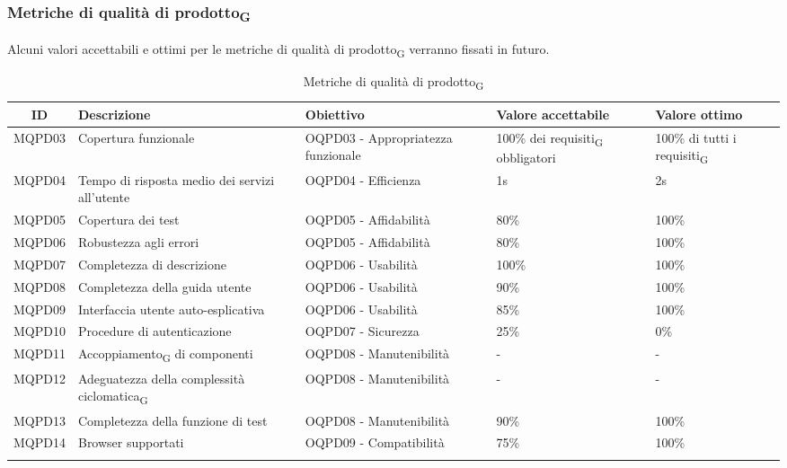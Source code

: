 \newpage
\subsubsection{Metriche di qualità di prodotto\textsubscript{G}}
Alcuni valori accettabili e ottimi per le metriche di qualità di prodotto\textsubscript{G} verranno fissati in futuro.
\begin{center}
	\setlength\extrarowheight{2pt}
	\begin{xltabular}{\textwidth}{|c|X|X|X|X|}
		\hline
		\textbf{ID} & \textbf{Descrizione} & \textbf{Obiettivo} & \textbf{Valore accettabile} & \textbf{Valore ottimo}\\
		\hline
		MQPD03 & Copertura funzionale & OQPD03 - Appropriatezza funzionale & 100\% dei requisiti\textsubscript{G} obbligatori & 100\% di tutti i requisiti\textsubscript{G}\\
		\hline
		MQPD04 & Tempo di risposta medio dei servizi all'utente & OQPD04 - Efficienza & 1s & 2s \\
		\hline
		MQPD05 & Copertura dei test & OQPD05 - Affidabilità & 80\% & 100\% \\
		\hline
		MQPD06 & Robustezza agli errori & OQPD05 - Affidabilità & 80\% & 100\% \\
		\hline
		MQPD07 & Completezza di descrizione & OQPD06 - Usabilità & 100\% &  100\% \\
		\hline
		MQPD08 & Completezza della guida utente & OQPD06 - Usabilità & 90\% &  100\% \\
		\hline
		MQPD09 & Interfaccia utente auto-esplicativa & OQPD06 - Usabilità & 85\% &  100\% \\
		\hline
		MQPD10 & Procedure di autenticazione & OQPD07 - Sicurezza & 25\% &  0\% \\
		\hline
		MQPD11 & Accoppiamento\textsubscript{G} di componenti & OQPD08 - Manutenibilità & - & - \\
		\hline
		MQPD12 & Adeguatezza della complessità ciclomatica\textsubscript{G} & OQPD08 - Manutenibilità & - & - \\
		\hline
		MQPD13 & Completezza della funzione di test & OQPD08 - Manutenibilità & 90\% & 100\% \\
		\hline
		MQPD14 & Browser supportati & OQPD09 - Compatibilità & 75\% & 100\% \\
		\hline
		\caption{Metriche di qualità di prodotto\textsubscript{G}}
	\end{xltabular}
\end{center}

